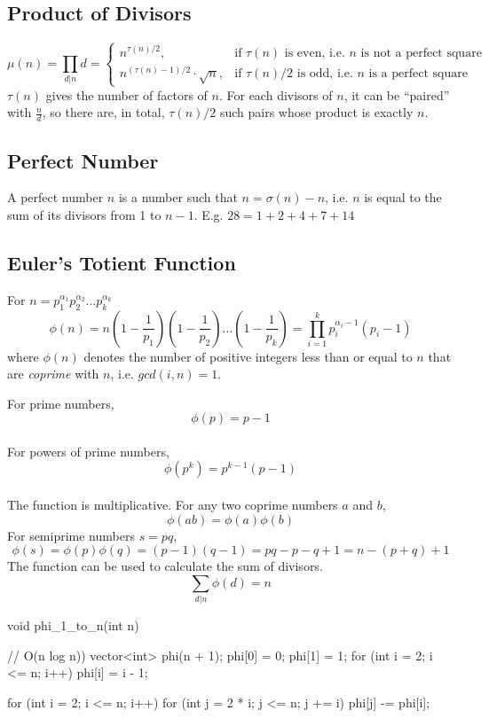 \documentclass[12pt]{extarticle}
\begin{document}
\subsection*{Product of Divisors}
$$\mu(n)=\prod_{d|n}d=\begin{cases}n^{\tau(n)/2},&\text{if $\tau(n)$ is even, i.e. $n$ is not a perfect square} \\ n^{(\tau(n)-1)/2}\cdot\sqrt{n},&\text{if $\tau(n)/2$ is odd, i.e. $n$ is a perfect square}  \end{cases}$$
$\tau(n)$ gives the number of factors of $n$. For each divisors of $n$, it can be ``paired'' with $\frac{n}{d}$, so there are, in total, $\tau(n)/2$ such pairs whose product is exactly $n$.
\subsection*{Perfect Number}
A perfect number $n$ is a number such that $n=\sigma(n)-n$, i.e. $n$ is equal to the sum of its divisors from 1 to $n-1$. E.g. $28=1+2+4+7+14$
\subsection*{Euler's Totient Function}
For $n=p_{1}^{\alpha_{1}}p_{2}^{\alpha_{2}}\dots p_{k}^{\alpha_{k}}$
$$\phi(n)=n(1-\frac{1}{p_{1}})(1-\frac{1}{p_{2}})\dots(1-\frac{1}{p_{k}})=\prod_{i=1}^{k}p_{i}^{\alpha_{i}-1}(p_{i}-1)$$
where $\phi(n)$ denotes the number of positive integers less than or equal to $n$ that are \emph{coprime} with $n$, i.e. $gcd(i, n)=1$. 
For prime numbers, $$\phi(p)=p-1$$\\
For powers of prime numbers, $$\phi(p^{k})=p^{k-1}(p-1)$$ \\
The function is multiplicative. For any two coprime numbers $a$ and $b$, $$\phi(ab)=\phi(a)\phi(b)$$
For semiprime numbers $s=pq$, $$\phi(s)=\phi(p)\phi(q)=(p-1)(q-1)=pq-p-q+1=n-(p+q)+1$$
The function can be used to calculate the sum of divisors. 
$$\sum_{d|n}\phi(d)=n$$
\begin{cpp}
void phi_1_to_n(int n) { // O(n log n))
    vector<int> phi(n + 1);
    phi[0] = 0;
    phi[1] = 1;
    for (int i = 2; i <= n; i++)
        phi[i] = i - 1;

    for (int i = 2; i <= n; i++)
        for (int j = 2 * i; j <= n; j += i)
              phi[j] -= phi[i];
}
\end{cpp}
\end{document}
